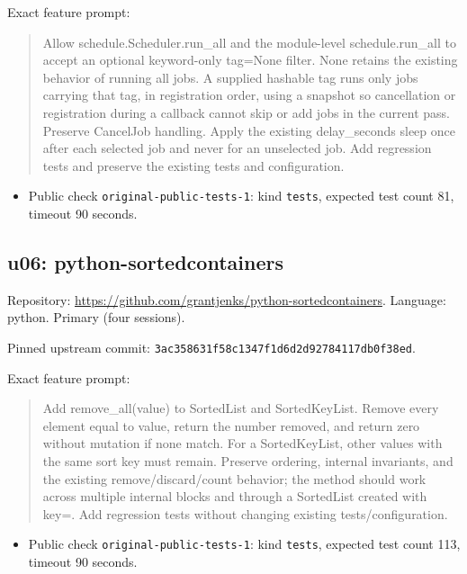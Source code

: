 \documentclass[manuscript,screen,nonacm]{acmart}
\providecommand{\tightlist}{\setlength{\itemsep}{0pt}\setlength{\parskip}{0pt}}
\begin{document}
Exact feature prompt:

\begin{quote}
Allow schedule.Scheduler.run\_all and the module-level schedule.run\_all
to accept an optional keyword-only tag=None filter. None retains the
existing behavior of running all jobs. A supplied hashable tag runs only
jobs carrying that tag, in registration order, using a snapshot so
cancellation or registration during a callback cannot skip or add jobs
in the current pass. Preserve CancelJob handling. Apply the existing
delay\_seconds sleep once after each selected job and never for an
unselected job. Add regression tests and preserve the existing tests and
configuration.
\end{quote}

\begin{itemize}
\tightlist
\item
  Public check \nolinkurl{original-public-tests-1}: kind \texttt{tests},
  expected test count 81, timeout 90 seconds.
\end{itemize}

\subsection{u06:
python-sortedcontainers}\label{u06-python-sortedcontainers}

Repository: \url{https://github.com/grantjenks/python-sortedcontainers}.
Language: python. Primary (four sessions).

Pinned upstream commit:
\nolinkurl{3ac358631f58c1347f1d6d2d92784117db0f38ed}.

Exact feature prompt:

\begin{quote}
Add remove\_all(value) to SortedList and SortedKeyList. Remove every
element equal to value, return the number removed, and return zero
without mutation if none match. For a SortedKeyList, other values with
the same sort key must remain. Preserve ordering, internal invariants,
and the existing remove/discard/count behavior; the method should work
across multiple internal blocks and through a SortedList created with
key=. Add regression tests without changing existing
tests/configuration.
\end{quote}

\begin{itemize}
\tightlist
\item
  Public check \nolinkurl{original-public-tests-1}: kind \texttt{tests},
  expected test count 113, timeout 90 seconds.
\end{itemize}
\end{document}
